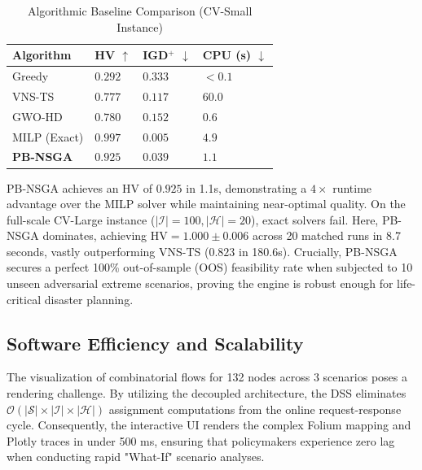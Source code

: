 \documentclass[conference]{IEEEtran}
\begin{document}
\begin{table}[htbp]
\caption{Algorithmic Baseline Comparison (CV-Small Instance)}
\label{tab:exp1_results}
\small
\centering
\begin{tabularx}{\linewidth}{l X X X}
\toprule
\textbf{Algorithm} & \textbf{HV $\uparrow$} & \textbf{IGD$^+$ $\downarrow$} & \textbf{CPU (s) $\downarrow$} \\
\midrule
Greedy           & $0.292$ & $0.333$ & $\mathbf{<\!0.1}$ \\
VNS-TS           & $0.777$ & $0.117$ & $60.0$ \\
GWO-HD           & $0.780$ & $0.152$ & $0.6$ \\
MILP (Exact)     & $\mathbf{0.997}$ & $\mathbf{0.005}$ & $4.9$ \\
\textbf{PB-NSGA} & $0.925$ & $0.039$ & $1.1$ \\
\bottomrule
\end{tabularx}
\end{table}

PB-NSGA achieves an HV of $0.925$ in 1.1s, demonstrating a $4\times$ runtime advantage over the MILP solver while maintaining near-optimal quality. On the full-scale CV-Large instance ($|\mathcal{I}|=100, |\mathcal{H}|=20$), exact solvers fail. Here, PB-NSGA dominates, achieving $\text{HV} = 1.000 \pm 0.006$ across 20 matched runs in 8.7 seconds, vastly outperforming VNS-TS ($0.823$ in 180.6s). Crucially, PB-NSGA secures a perfect 100\% out-of-sample (OOS) feasibility rate when subjected to 10 unseen adversarial extreme scenarios, proving the engine is robust enough for life-critical disaster planning.

\subsection{Software Efficiency and Scalability}
The visualization of combinatorial flows for 132 nodes across 3 scenarios poses a rendering challenge. By utilizing the decoupled architecture, the DSS eliminates $\mathcal{O}(|\mathcal{S}| \times |\mathcal{I}| \times |\mathcal{H}|)$ assignment computations from the online request-response cycle. Consequently, the interactive UI renders the complex Folium mapping and Plotly traces in under 500 ms, ensuring that policymakers experience zero lag when conducting rapid "What-If" scenario analyses.
\end{document}
